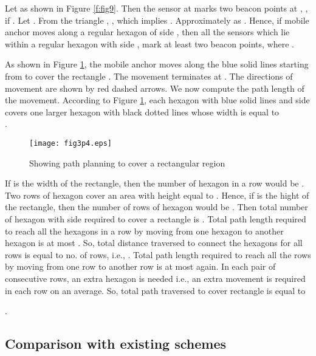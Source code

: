 \documentclass[preprint,11pt]{elsarticle}
\begin{document}
Let  as shown in Figure \ref{f:fig9}. Then the sensor at  marks two beacon points at , , if .
Let . From the triangle  , , which implies .
Approximately  as . Hence, if mobile anchor moves along a regular hexagon of side , then all the sensors which lie within a regular
hexagon with side , mark at least two beacon points, where .

As shown in Figure \ref{f:fig10}, the mobile anchor moves along the blue solid lines starting from  to cover the rectangle .
The movement terminates at .  The directions of movement are shown by red dashed arrows. We now compute the path length of the movement. According to Figure \ref{f:fig10}, each hexagon with blue solid lines and side  covers one larger hexagon with black dotted lines whose width is equal to \\ .
\begin{figure}[h]
\begin{center}
\texttt{[image: fig3p4.eps]}
\caption{\label{f:fig10} Showing path planning to cover a rectangular region }
\end{center}
\end{figure}
If  is the width of the rectangle, then the number of hexagon in a row would be .
Two rows of hexagon cover an area with height equal to . Hence, if  is the hight of
the rectangle, then the number of rows of hexagon would be . Then total number of
hexagon with side  required to cover a  rectangle is .
Total path length required to reach all the hexagons in a row by moving from one hexagon to another hexagon is at most .
So, total distance traversed to connect the hexagons for all rows is equal to  no. of rows, i.e., .
Total path length required to reach all the rows by moving from one row to another row is at most  again.
In each pair of consecutive rows, an extra hexagon is needed i.e., an extra  movement is required in each row on an average.
So, total path traversed to cover  rectangle is equal to

.

\subsection{Comparison with existing schemes}
\end{document}
